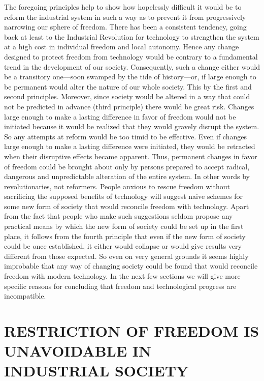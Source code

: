  The foregoing principles help to show how hopelessly difficult it would be to reform the industrial system in such a way as to prevent it from progressively narrowing our sphere of freedom. There has been a consistent tendency, going back at least to the Industrial Revolution for technology to strengthen the system at a high cost in individual freedom and local autonomy. Hence any change designed to protect freedom from technology would be contrary to a fundamental trend in the development of our society. Consequently, such a change either would be a transitory one—soon swamped by the tide of history—or, if large enough to be permanent would alter the nature of our whole society. This by the first and second principles. Moreover, since society would be altered in a way that could not be predicted in advance (third principle) there would be great risk. Changes large enough to make a lasting difference in favor of freedom would not be initiated because it would be realized that they would gravely disrupt the system. So any attempts at reform would be too timid to be effective. Even if changes large enough to make a lasting difference were initiated, they would be retracted when their disruptive effects became apparent. Thus, permanent changes in favor of freedom could be brought about only by persons prepared to accept radical, dangerous and unpredictable alteration of the entire system. In other words by revolutionaries, not reformers.
 People anxious to rescue freedom without sacrificing the supposed benefits of technology will suggest naive schemes for some new form of society that would reconcile freedom with technology. Apart from the fact that people who make such suggestions seldom propose any practical means by which the new form of society could be set up in the first place, it follows from the fourth principle that even if the new form of society could be once established, it either would collapse or would give results very different from those expected.
 So even on very general grounds it seems highly improbable that any way of changing society could be found that would reconcile freedom with modern technology. In the next few sections we will give more specific reasons for concluding that freedom and technological progress are incompatible.

\chapter{RESTRICTION OF FREEDOM IS UNAVOIDABLE IN INDUSTRIAL SOCIETY}

